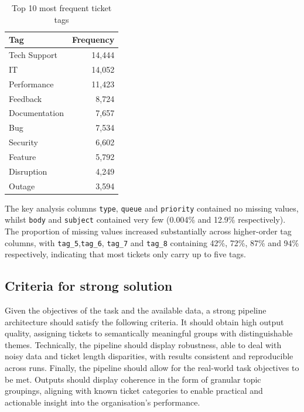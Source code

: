 \documentclass[11pt]{article}
\begin{document}
\begin{table}[H]
\centering
\caption{Top 10 most frequent ticket tags}
\label{tab:tagdist}
\begin{tabular}{lr}
\hline
\textbf{Tag} & \textbf{Frequency} \\
\hline
Tech Support & 14,444 \\
IT & 14,052 \\
Performance & 11,423 \\
Feedback & 8,724 \\
Documentation & 7,657 \\
Bug & 7,534 \\
Security & 6,602 \\
Feature & 5,792 \\
Disruption & 4,249 \\
Outage & 3,594 \\
\hline
\end{tabular}
\end{table}

The key analysis columns \texttt{type}, \texttt{queue} and \texttt{priority} contained no missing values, whilst \texttt{body} and \texttt{subject} contained very few (0.004\% and 12.9\% respectively). The proportion of missing values increased substantially across higher-order tag columns, with \texttt{tag\_5},\texttt{tag\_6}, \texttt{tag\_7} and \texttt{tag\_8} containing 42\%, 72\%, 87\% and 94\% respectively, indicating that most tickets only carry up to five tags.

\subsection{Criteria for strong solution}
Given the objectives of the task and the available data, a strong pipeline architecture should satisfy the following criteria. It should obtain high output quality, assigning tickets to semantically meaningful groups with distinguishable themes. Technically, the pipeline should display robustness, able to deal with noisy data and ticket length disparities,  with results consistent and reproducible across runs. Finally, the pipeline should allow for the real-world task objectives to be met. Outputs should display coherence in the form of granular topic groupings, aligning with known ticket categories to enable practical and actionable insight into the organisation’s performance.













\end{document}

